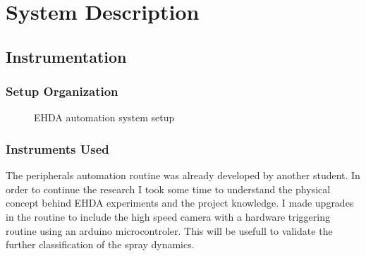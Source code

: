 \chapter[System Description]{System Description}
\label{chap:descricaoproblema}





\section{Instrumentation}
\label{sec:instrumentation}

\subsection{Setup Organization}
\label{subsec:setup_organization}



\begin{figure}[H]
  \centering
  \caption{EHDA automation system setup}
  \label{fig:setup_pic}
\end{figure}


\subsection{Instruments Used}
\label{subsec:instruments}

The peripherals automation routine was already developed by another student. In order to continue the research I took some time to understand the physical concept behind EHDA experiments and the project knowledge.
I made upgrades in the routine to include the high speed camera with a hardware triggering routine using an arduino microcontroler. This will be usefull to validate the further classification of the spray dynamics.


